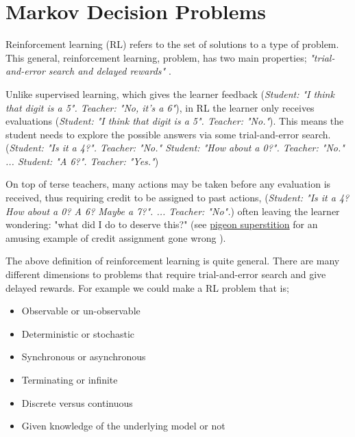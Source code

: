 \chapter{Markov Decision Problems}\label{mdps}

Reinforcement learning (RL) refers to the set of solutions to a type of problem.
This general, reinforcement learning, problem, has two main properties;
\textit{"trial-and-error search and delayed rewards"} \cite{Sutton2018}.

Unlike supervised learning, which gives the learner feedback (\textit{Student: "I think that digit
is a 5". Teacher: "No, it's a 6"}), in RL the learner only receives evaluations (\textit{Student: "I think
that digit is a 5". Teacher: "No."}). This means the student needs to explore the possible answers via some trial-and-error search.
(\textit{Student: "Is it a 4?". Teacher: "No." Student: "How about a 0?". Teacher: "No." ... Student: "A 6?". Teacher: "Yes."})

On top of terse teachers, many actions may be taken before any evaluation is received, thus requiring credit to be assigned to past actions,
(\textit{Student: "Is it a 4? How about a 0? A 6? Maybe a 7?". ... Teacher: "No".})
often leaving the learner wondering: "what did I do to deserve this?" (see
\href{https://www.youtube.com/watch?v=Qv4H81gEGDQ}{pigeon superstition} for an amusing
example of credit assignment gone wrong \cite{Box1997}).


\vspace{5mm}

The above definition of reinforcement learning is quite general. There are many
different dimensions to problems that require trial-and-error search and give
delayed rewards. For example we could make a RL problem that is;

\begin{itemize}
\tightlist
\item
  Observable or un-observable \cite{Kaelbling1998}
\item
  Deterministic or stochastic \cite{Putterman2015}
\item
  Synchronous or asynchronous \cite{Bertsekas1995}
\item
  Terminating or infinite \cite{Putterman2015}
\item
  Discrete versus continuous \cite{Bertsekas1995}
\item
  Given knowledge of the underlying model or not \cite{Sutton1991}
\end{itemize}

